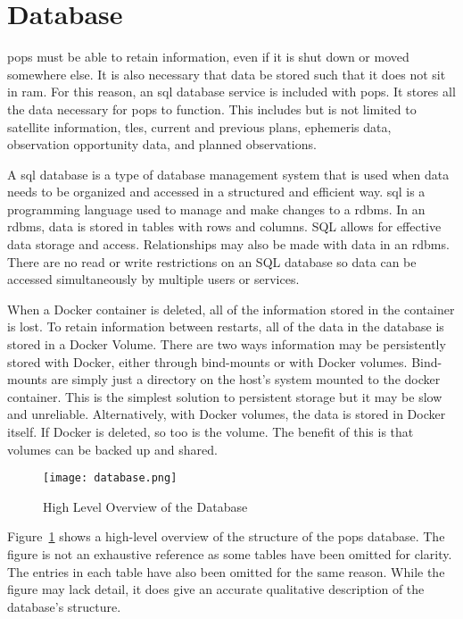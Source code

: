 
\section{Database}\label{sec:database}

\gls{pops} must be able to retain information, even if it is
shut down or moved somewhere else. It is also necessary that data be stored
such that it does not sit in \gls{ram}. For this reason, an \acrshort{sql}
database service is included with \gls{pops}. It stores all the data necessary
for \gls{pops} to function. This includes but is not limited to satellite
information, \glspl{tle}, current and previous plans, ephemeris data,
observation opportunity data, and planned observations. 

A \gls{sql} database is a type of database management system that is used when
data needs to be organized and accessed in a structured and efficient way.
\gls{sql} is a programming language used to manage and make changes to a
\gls{rdbms}. In an \gls{rdbms}, data is stored in tables with rows and columns.
SQL allows for effective data storage and access. Relationships may also be
made with data in an \gls{rdbms}. There are no read or write restrictions on an
SQL database so data can be accessed simultaneously by multiple users or
services.

When a Docker container is deleted, all of the information stored in the
container is lost. To retain information between restarts, all of the data in
the database is stored in a Docker Volume. There are two ways information may
be persistently stored with Docker, either through bind-mounts or with Docker
volumes. Bind-mounts are simply just a directory on the host's system mounted
to the docker container. This is the simplest solution to persistent storage
but it may be slow and unreliable. Alternatively, with Docker volumes, the data
is stored in Docker itself. If Docker is deleted, so too is the volume. The
benefit of this is that volumes can be backed up and shared.

\begin{figure}[h]
    \centering
    \texttt{[image: database.png]} 
    \caption{High Level Overview of the Database}
    \label{fig:database} 
\end{figure}

Figure~\ref{fig:database} shows a high-level overview of the structure of the
\gls{pops} database. The figure is not an exhaustive reference as some tables
have been omitted for clarity. The entries in each table have also been
omitted for the same reason. While the figure may lack detail, it does give an
accurate qualitative description of the database's structure. 

